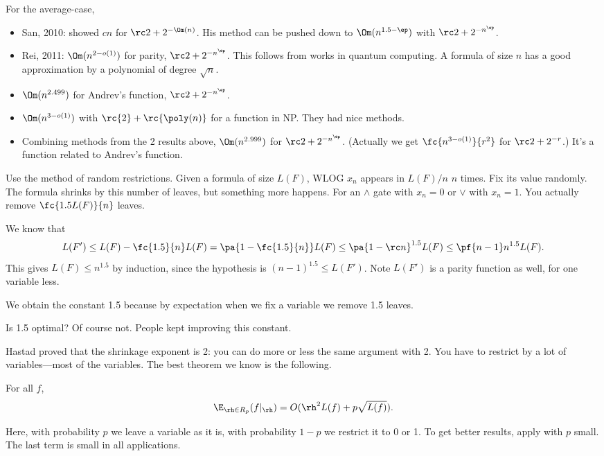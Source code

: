 For the average-case, 
\begin{itemize}
\item
San, 2010: showed $cn $ for $\rc2+2^{-\Om(n)}$. His method can be pushed down to $\Om(n^{1.5-\ep})$ with $\rc2+2^{-n^{\ep}}$.
\item
Rei, 2011: $\Om(n^{2-o(1)})$ for parity, $\rc2+2^{-n^{\ep}}$. This follows from works in quantum computing. A formula of size $n$ has a good approximation by a polynomial of degree $\sqrt n$.
\item
$\Om(n^{2.499})$ for Andrev's function, $\rc2+2^{-n^{\ep}}$.
\item
$\Om(n^{3-o(1)})$ with $\rc{2}+\rc{\poly(n)}$ for a function in NP. They had nice methods. 
\item Combining methods from the 2 results above, $\Om(n^{2.999})$ for $\rc2+2^{-n^{\ep}}$. (Actually we get $\fc{n^{3-o(1)}}{r^2}$ for $\rc2+2^{-r}$.) It's a function related to Andrev's function.
\end{itemize}
Use the method of random restrictions. 
Given a formula of size $L(F)$, WLOG $x_n$ appears in $L(F)/n$ $n$ times. Fix its value randomly. The formula shrinks by this number of leaves, but something more happens. For an $\wedge$ gate with $x_n=0$ or $\vee$ with $x_n=1$. You actually remove $\fc{1.5L(F)}{n}$ leaves.

We know that 
\[L(F')\le L(F)-\fc{1.5}{n} L(F)=\pa{1-\fc{1.5}{n}}L(F)\le \pa{1-\rc n}^{1.5}L(F)\le \pf{n-1}n^{1.5}L(F).\]
This gives $L(F)\le n^{1.5}$ by induction, since the hypothesis is $(n-1)^{1.5}\le L(F')$. Note $L(F')$ is a parity function as well, for one variable less.

We obtain the constant 1.5 because by expectation when we fix a variable we remove 1.5 leaves.



Is 1.5 optimal? Of course not. 
People kept improving this constant.

Hastad proved that the shrinkage exponent is 2: you can do more or less the same argument with 2. You have to restrict by a lot of variables---most of the variables. The best theorem we know is the following.
\begin{thm}
For all $f$,
\[
\E_{\rh\in R_p} (f|_{\rh}) = 
O(\rh^2L(f)+ p\sqrt{L(f)}).
\]
\end{thm}
Here, with probability $p$ we leave a variable as it is, with probability $1-p$ we restrict it to 0 or 1.
To get better results, apply with $p$ small. The last term is small in all applications.

